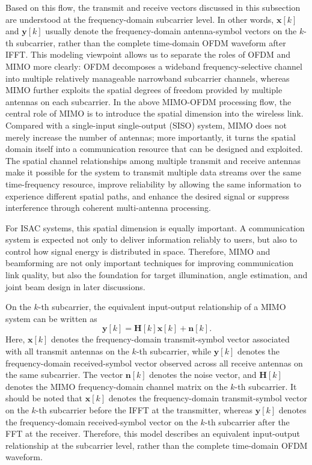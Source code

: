 Based on this flow,
the transmit and receive vectors discussed in this subsection are understood at the frequency-domain subcarrier level.
In other words,
\(\mathbf{x}[k]\) and \(\mathbf{y}[k]\) usually denote the frequency-domain antenna-symbol vectors
on the \(k\)-th subcarrier,
rather than the complete time-domain OFDM waveform after IFFT.
This modeling viewpoint allows us to separate the roles of OFDM and MIMO more clearly:
OFDM decomposes a wideband frequency-selective channel into multiple relatively manageable narrowband subcarrier channels,
whereas MIMO further exploits the spatial degrees of freedom provided by multiple antennas on each subcarrier.
In the above MIMO-OFDM processing flow,
the central role of MIMO is to introduce the spatial dimension into the wireless link.
Compared with a single-input single-output (SISO) system,
MIMO does not merely increase the number of antennas;
more importantly,
it turns the spatial domain itself into a communication resource that can be designed and exploited.
The spatial channel relationships among multiple transmit and receive antennas make it possible for the system
to transmit multiple data streams over the same time-frequency resource,
improve reliability by allowing the same information to experience different spatial paths,
and enhance the desired signal or suppress interference through coherent multi-antenna processing.

For ISAC systems,
this spatial dimension is equally important.
A communication system is expected not only to deliver information reliably to users,
but also to control how signal energy is distributed in space.
Therefore,
MIMO and beamforming are not only important techniques for improving communication link quality,
but also the foundation for target illumination,
angle estimation,
and joint beam design in later discussions.

On the \(k\)-th subcarrier,
the equivalent input-output relationship of a MIMO system can be written as
\begin{equation}
\mathbf{y}[k]
=
\mathbf{H}[k]\mathbf{x}[k]
+
\mathbf{n}[k].
\label{eq:mimo_ofdm_subcarrier_model}
\end{equation}
Here,
\(\mathbf{x}[k]\) denotes the frequency-domain transmit-symbol vector associated with all transmit antennas
on the \(k\)-th subcarrier,
while \(\mathbf{y}[k]\) denotes the frequency-domain received-symbol vector observed across all receive antennas
on the same subcarrier.
The vector \(\mathbf{n}[k]\) denotes the noise vector,
and \(\mathbf{H}[k]\) denotes the MIMO frequency-domain channel matrix on the \(k\)-th subcarrier.
It should be noted that \(\mathbf{x}[k]\) denotes the frequency-domain transmit-symbol vector
on the \(k\)-th subcarrier before the IFFT at the transmitter,
whereas \(\mathbf{y}[k]\) denotes the frequency-domain received-symbol vector
on the \(k\)-th subcarrier after the FFT at the receiver.
Therefore,
this model describes an equivalent input-output relationship at the subcarrier level,
rather than the complete time-domain OFDM waveform.


